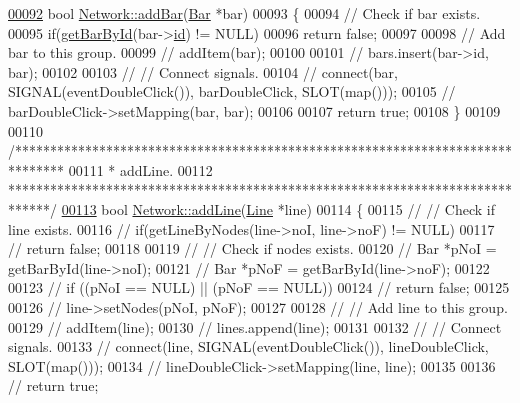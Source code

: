 \begin{DoxyCode}
\hypertarget{network_8cpp_source_l00092}{}\hyperlink{group___graphics_ga8c5dfef0216731246f7411e1a5fbee01}{00092} \textcolor{keywordtype}{bool} \hyperlink{group___graphics_ga8c5dfef0216731246f7411e1a5fbee01}{Network::addBar}(\hyperlink{class_bar}{Bar} *bar)
00093 \{
00094   \textcolor{comment}{// Check if bar exists.}
00095   \textcolor{keywordflow}{if}(\hyperlink{group___graphics_ga9c5806f5a0d236bb6d8abbdce62d9675}{getBarById}(bar->\hyperlink{class_bar_a9dc5c6a6d44fe412ae34ef8a881b8dce}{id}) != NULL)
00096     \textcolor{keywordflow}{return} \textcolor{keyword}{false};
00097 
00098   \textcolor{comment}{// Add bar to this group.}
00099 \textcolor{comment}{//  addItem(bar);}
00100 
00101 \textcolor{comment}{//  bars.insert(bar->id, bar);}
00102 
00103 \textcolor{comment}{//  // Connect signals.}
00104 \textcolor{comment}{//  connect(bar, SIGNAL(eventDoubleClick()), barDoubleClick, SLOT(map()));}
00105 \textcolor{comment}{//  barDoubleClick->setMapping(bar, bar);}
00106 
00107   \textcolor{keywordflow}{return} \textcolor{keyword}{true};
00108 \}
00109 
00110 \textcolor{comment}{/*******************************************************************************}
00111 \textcolor{comment}{ * addLine.}
00112 \textcolor{comment}{ ******************************************************************************/}
\hypertarget{network_8cpp_source_l00113}{}\hyperlink{group___graphics_gae02945131494987b3ff9b59b627719b4}{00113} \textcolor{keywordtype}{bool} \hyperlink{group___graphics_gae02945131494987b3ff9b59b627719b4}{Network::addLine}(\hyperlink{class_line}{Line} *line)
00114 \{
00115 \textcolor{comment}{//  // Check if line exists.}
00116 \textcolor{comment}{//  if(getLineByNodes(line->noI, line->noF) != NULL)}
00117 \textcolor{comment}{//    return false;}
00118 
00119 \textcolor{comment}{//  // Check if nodes exists.}
00120 \textcolor{comment}{//  Bar *pNoI = getBarById(line->noI);}
00121 \textcolor{comment}{//  Bar *pNoF = getBarById(line->noF);}
00122 
00123 \textcolor{comment}{//  if ((pNoI == NULL) || (pNoF == NULL))}
00124 \textcolor{comment}{//    return false;}
00125 
00126 \textcolor{comment}{//  line->setNodes(pNoI, pNoF);}
00127 
00128 \textcolor{comment}{//  // Add line to this group.}
00129 \textcolor{comment}{//  addItem(line);}
00130 \textcolor{comment}{//  lines.append(line);}
00131 
00132 \textcolor{comment}{//  // Connect signals.}
00133 \textcolor{comment}{//  connect(line, SIGNAL(eventDoubleClick()), lineDoubleClick, SLOT(map()));}
00134 \textcolor{comment}{//  lineDoubleClick->setMapping(line, line);}
00135 
00136 \textcolor{comment}{//  return true;}

\end{DoxyCode}
